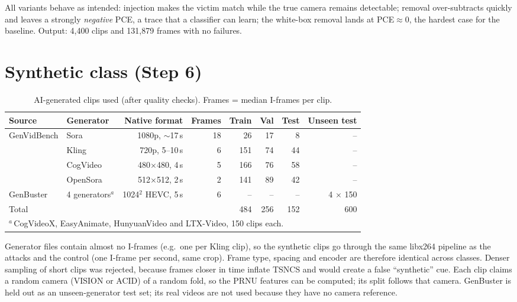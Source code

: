 \documentclass[11pt,a4paper]{article}
\begin{document}
All variants behave as intended: injection makes the victim match while the true camera remains
detectable; removal over-subtracts quickly and leaves a strongly \emph{negative} PCE, a trace that a
classifier can learn; the white-box removal lands at PCE$\approx0$, the hardest case for the baseline.
Output: 4{,}400 clips and 131{,}879 frames with no failures.

\section{Synthetic class (Step 6)}

\begin{table}[H]
\centering\small
\caption{AI-generated clips used (after quality checks). Frames = median I-frames per clip.}
\label{tab:synthetic}
\begin{tabular}{llrrrrrr}
\toprule
Source & Generator & Native format & Frames & Train & Val & Test & Unseen test \\
\midrule
GenVidBench & Sora     & 1080p, $\sim$17\,s & 18 & 26  & 17 & 8  & -- \\
            & Kling    & 720p, 5--10\,s     & 6  & 151 & 74 & 44 & -- \\
            & CogVideo & 480$\times$480, 4\,s & 5 & 166 & 76 & 58 & -- \\
            & OpenSora & 512$\times$512, 2\,s & 2 & 141 & 89 & 42 & -- \\
GenBuster   & 4 generators$^{a}$ & 1024$^2$ HEVC, 5\,s & 6 & -- & -- & -- & 4 $\times$ 150 \\
\midrule
Total       & & & & 484 & 256 & 152 & 600 \\
\bottomrule
\multicolumn{8}{l}{\footnotesize $^{a}$\,CogVideoX, EasyAnimate, HunyuanVideo and LTX-Video, 150 clips each.}
\end{tabular}
\end{table}

Generator files contain almost no I-frames (e.g.\ one per Kling clip), so the synthetic clips go
through the same libx264 pipeline as the attacks and the control (one I-frame per second, same crop).
Frame type, spacing and encoder are therefore identical across classes. Denser sampling of short
clips was rejected, because frames closer in time inflate TSNCS and would create a false
``synthetic'' cue. Each clip claims a random camera (VISION or ACID) of a random fold, so the PRNU
features can be computed; its split follows that camera. GenBuster is held out as an unseen-generator
test set; its real videos are not used because they have no camera reference.
\end{document}
